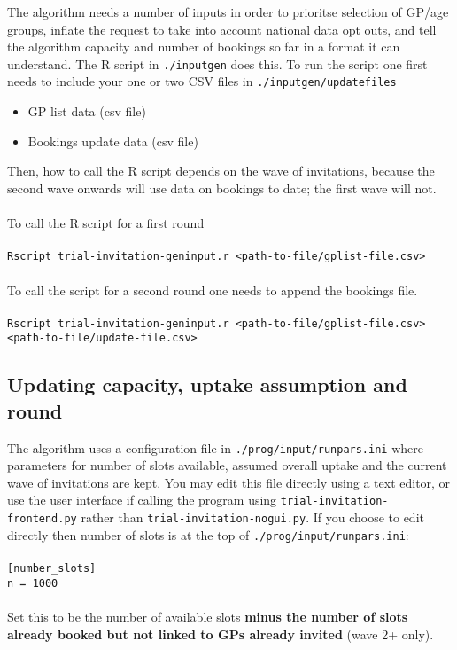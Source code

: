 \documentclass[a4paper]{article}
\begin{document}
The algorithm needs a number of inputs in order to prioritse selection of GP/age groups, inflate the request to take into account national data opt outs, and tell the algorithm capacity and number of bookings so far in a format it can understand.
The R script in \texttt{./inputgen} does this. To run the script one first needs to include your one or two CSV files in \texttt{./inputgen/updatefiles}
        \begin{itemize}
                \item GP list data (csv file)
                \item Bookings update data (csv file)
        \end{itemize}
Then, how to call the R script depends on the wave of invitations, because the second wave onwards will use data on bookings to date; the first wave will not.\\
\\ To call the R script for a first round\\ %
\\ \texttt{Rscript trial-invitation-geninput.r <path-to-file/gplist-file.csv>} \\
\\ To call the script for a second round one needs to append the bookings file.\\ %
\\ \texttt{Rscript trial-invitation-geninput.r <path-to-file/gplist-file.csv> <path-to-file/update-file.csv>}\\

\subsection{Updating capacity, uptake assumption and round}

The algorithm uses a configuration file in \texttt{./prog/input/runpars.ini} where parameters for number of slots available, assumed overall uptake and the current wave of invitations are kept. You may edit this file directly using a text editor, or use the user interface if calling the program using \texttt{trial-invitation-frontend.py} rather than \texttt{trial-invitation-nogui.py}. If you choose to edit directly then number of slots is at the top of \texttt{./prog/input/runpars.ini}:\\ \\
\texttt{[number\_slots] \\
n = 1000}\\ \\
Set this to be the number of available slots \textbf{minus the number of slots already booked but not linked to GPs already invited} (wave 2+ only).\\ \\
\end{document}
